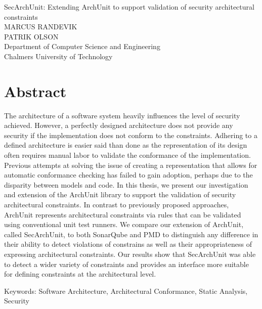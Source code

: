 SecArchUnit: Extending ArchUnit to support validation of security architectural constraints\\
MARCUS RANDEVIK\\
PATRIK OLSON\\
Department of Computer Science and Engineering\\
Chalmers University of Technology \setlength{\parskip}{0.5cm}

\thispagestyle{plain}			%
\setlength{\parskip}{0pt plus 1.0pt}
\section*{Abstract}
The architecture of a software system heavily influences the level of security achieved.  However, a perfectly designed architecture does not provide any security if the implementation does not conform to the constraints. Adhering to a defined architecture is easier said than done as the representation of its design often requires manual labor to validate the conformance of the implementation. Previous attempts at solving the issue of creating a representation that allows for automatic conformance checking has failed to gain adoption, perhaps due to the disparity between models and code. In this thesis, we present our investigation and extension of the ArchUnit library to support the validation of security architectural constraints. In contrast to previously proposed approaches, ArchUnit represents architectural constraints via rules that can be validated using conventional unit test runners.  We compare our extension of ArchUnit, called SecArchUnit, to both SonarQube and PMD to distinguish any difference in their ability to detect violations of constrains as well as their appropriateness of expressing architectural constraints. Our results show that SecArchUnit was able to detect a wider variety of constraints and provides an interface more suitable for defining constraints at the architectural level.

\vfill
Keywords: Software Architecture, Architectural Conformance, Static Analysis, Security

\newpage				%
\thispagestyle{empty}
\mbox{}